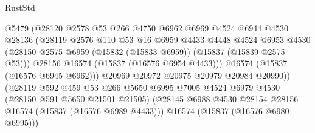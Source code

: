\begin{lexlean}{RustStd}
\begin{coremodule}
                                  @5479
                                  (@28120
                                    @2578
                                    @53
                                    @266
                                    @4750
                                    @6962
                                    @6969
                                    @4524
                                    @6944
                                    @4530
                                    @28136
                                    (@28119
                                      @2576
                                      @110
                                      @53
                                      @16
                                      @6959
                                      @4433
                                      @4448
                                      @4524
                                      @6953
                                      @4530
                                      (@28150
                                        @2575
                                        @6959
                                        (@15832 (@15833 @6959))
                                        (@15837 (@15839 @2575 @53)))
                                      @28156
                                      @16574
                                      (@15837 (@16576 @6954 @4433)))
                                    @16574
                                    (@15837 (@16576 @6945 @6962)))
                                  @20969
                                  @20972
                                  @20975
                                  @20979
                                  @20984
                                  @20990))
                              (@28119
                                @592
                                @459
                                @53
                                @266
                                @5650
                                @6995
                                @7005
                                @4524
                                @6979
                                @4530
                                (@28150 @591 @5650 @21501 @21505)
                                (@28145
                                  @6988
                                  @4530
                                  @28154
                                  @28156
                                  @16574
                                  (@15837 (@16576 @6989 @4433)))
                                @16574
                                (@15837 (@16576 @6980 @6995)))

\end{coremodule}
\end{lexlean}
